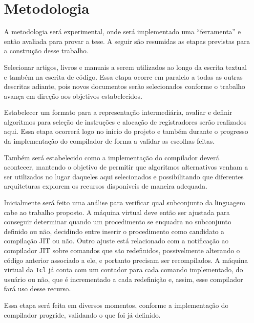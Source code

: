 

\section{Metodologia}

A metodologia será experimental, onde será implementado uma
``ferramenta'' e então avaliada para provar a tese. A seguir são
resumidas as etapas previstas para a construção desse trabalho.
\quad\\


Selecionar artigos, livros e manuais a serem utilizados ao longo da
escrita textual e também na escrita de código. Essa etapa ocorre em
paralelo a todas as outras descritas adiante, pois novos
documentos serão selecionados conforme o trabalho avança em direção
aos objetivos estabelecidos.


Estabelecer um formato para a representação intermediária, avaliar e
definir algoritmos para seleção de instruções e alocação de
registradores serão realizados aqui. Essa etapa ocorrerá logo no inicio
do projeto e também durante o progresso da implementação do compilador
de forma a validar as escolhas feitas.

Também será estabelecido como a implementação do compilador deverá
acontecer, mantendo o objetivo de permitir que algoritmos
alternativos venham a ser utilizados no lugar daqueles aqui
selecionados e possibilitando que diferentes arquiteturas explorem os
recursos disponíveis de maneira adequada.


Inicialmente será feito uma análise para verificar qual subconjunto da
linguagem cabe ao trabalho proposto. A máquina virtual deve então ser
ajustada para conseguir determinar quando um procedimento se enquadra no
subconjunto definido ou não, decidindo entre inserir o
procedimento como candidato a compilação JIT ou não. Outro ajuste está
relacionado com a notificação ao compilador JIT sobre comandos que são
redefinidos, possivelmente alterando o código anterior associado a ele, e
portanto precisam ser recompilados. A máquina virtual da \texttt{Tcl}
já conta com um contador para cada comando implementado, do usuário ou
não, que é incrementado a cada redefinição e, assim, esse
compilador fará uso desse recurso.

Essa etapa será feita em diversos momentos, conforme a implementação
do compilador progride, validando o que foi já definido.

